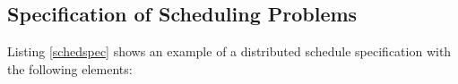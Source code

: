 % 
% 


\subsection{Specification of Scheduling Problems}

Listing \ref{schedspec} shows an example of a distributed schedule specification with the following elements:

